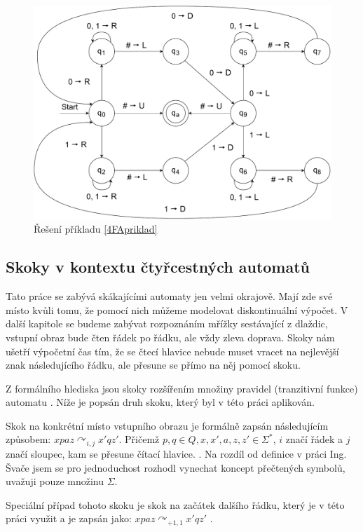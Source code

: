 \begin{figure}[H]
    \centering
    \includegraphics[width=\textwidth]{obrazky-figures/4FA_priklad.pdf}
    \caption{Řešení příkladu \ref{4FApriklad}}
    \label{fig:reseni4FAprikladu}
\end{figure}

\subsection*{Skoky v kontextu čtyřcestných automatů}
\label{skok}

Tato práce se zabývá skákajícími automaty jen velmi okrajově. Mají zde své místo kvůli tomu, že pomocí nich můžeme modelovat diskontinuální výpočet. V další kapitole se budeme zabývat rozpoznáním mřížky sestávající z dlaždic, vstupní obraz bude čten řádek po řádku, ale vždy zleva doprava. Skoky nám ušetří výpočetní čas tím, že se čtecí hlavice nebude muset vracet na nejlevější znak následujícího řádku, ale přesune se přímo na něj pomocí skoku. 

Z formálního hlediska jsou skoky rozšířením množiny pravidel (tranzitivní funkce) automatu \cite{DiplomkaSvac}. Níže je popsán druh skoku, který byl v této práci aplikován.

\begin{definition}
Skok na konkrétní místo vstupního obrazu je formálně zapsán následujícím způsobem: $xpaz \curvearrowright_{i, j} x'qz'$.
Přičemž $p, q \in Q, x, x', a, z, z' \in \Sigma^*$, $i$ značí řádek a $j$ značí sloupec, kam se přesune čítací hlavice.  \cite{DiplomkaSvac}. Na rozdíl od definice v práci Ing. Švače jsem se pro jednoduchost rozhodl vynechat koncept přečtených symbolů, uvažuji pouze množinu $\Sigma$.

Speciální případ tohoto skoku je skok na začátek dalšího řádku, který je v této práci využit a je zapsán jako: $xpaz \curvearrowright_{+1, 1} x'qz'$ \cite{DiplomkaSvac}.
\end{definition} 

